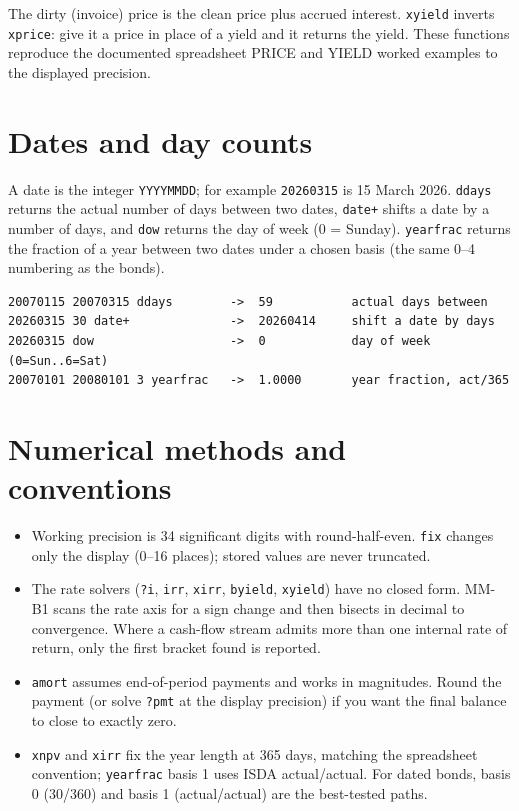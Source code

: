 \documentclass[11pt]{article}
\newcommand{\w}[1]{\texttt{#1}}
\begin{document}
The dirty (invoice) price is the clean price plus accrued interest. \w{xyield}
inverts \w{xprice}: give it a price in place of a yield and it returns the
yield. These functions reproduce the documented spreadsheet PRICE and YIELD
worked examples to the displayed precision.

\section{Dates and day counts}

A date is the integer \w{YYYYMMDD}; for example \w{20260315} is 15 March 2026.
\w{ddays} returns the actual number of days between two dates, \w{date+} shifts
a date by a number of days, and \w{dow} returns the day of week (0 = Sunday).
\w{yearfrac} returns the fraction of a year between two dates under a chosen
basis (the same 0--4 numbering as the bonds).

\begin{lstlisting}
20070115 20070315 ddays        ->  59           actual days between
20260315 30 date+              ->  20260414     shift a date by days
20260315 dow                   ->  0            day of week (0=Sun..6=Sat)
20070101 20080101 3 yearfrac   ->  1.0000       year fraction, act/365
\end{lstlisting}

\section{Numerical methods and conventions}

\begin{itemize}[leftmargin=1.4em]
\item Working precision is 34 significant digits with round-half-even. \w{fix}
      changes only the display (0--16 places); stored values are never
      truncated.
\item The rate solvers (\w{?i}, \w{irr}, \w{xirr}, \w{byield}, \w{xyield}) have
      no closed form. MM-B1 scans the rate axis for a sign change and then
      bisects in decimal to convergence. Where a cash-flow stream admits more
      than one internal rate of return, only the first bracket found is
      reported.
\item \w{amort} assumes end-of-period payments and works in magnitudes. Round
      the payment (or solve \w{?pmt} at the display precision) if you want the
      final balance to close to exactly zero.
\item \w{xnpv} and \w{xirr} fix the year length at 365 days, matching the
      spreadsheet convention; \w{yearfrac} basis 1 uses ISDA actual/actual. For
      dated bonds, basis 0 (30/360) and basis 1 (actual/actual) are the
      best-tested paths.
\end{itemize}
\end{document}
